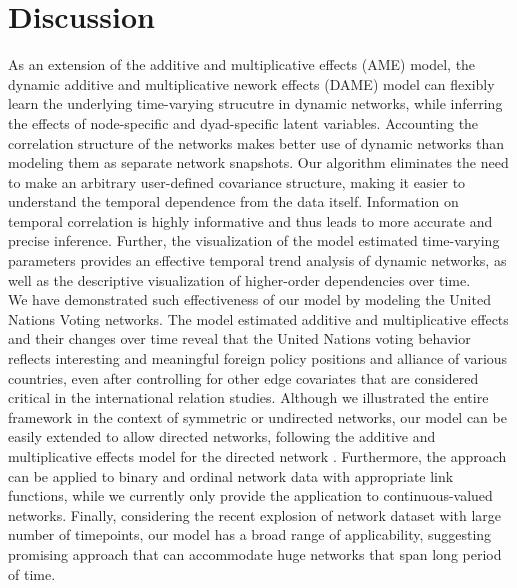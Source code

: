 \documentclass[a4paper]{article}
\begin{document}
\section{Discussion}
As an extension of the additive and multiplicative effects (AME) model, the dynamic additive and multiplicative nework effects (DAME) model can flexibly learn the underlying time-varying strucutre in dynamic networks, while inferring the effects of node-specific and dyad-specific latent variables. Accounting the correlation structure of the networks makes better use of dynamic networks than modeling them as separate network snapshots. Our algorithm eliminates the need to make an arbitrary user-defined covariance structure, making it easier to understand the temporal dependence from the data itself. Information on temporal correlation is highly informative and thus leads to more accurate and precise inference. Further, the visualization of the model estimated time-varying parameters provides an effective temporal trend analysis of dynamic networks, as well as the descriptive visualization of higher-order dependencies over time.
\\\newline
We have demonstrated such effectiveness of our model by modeling the United Nations Voting networks. The model estimated additive and multiplicative effects and their changes over time reveal that the United Nations voting behavior reflects interesting and meaningful foreign policy positions and alliance of various countries, even after controlling for other edge covariates that are considered critical in the international relation studies. Although we illustrated the entire framework in the context of symmetric or undirected networks, our model can be easily extended to allow directed networks, following the additive and multiplicative effects model for the directed network \citep{minhas2016inferential}. Furthermore, the approach can be applied to binary and ordinal network data with appropriate link functions, while we currently only provide the application to continuous-valued networks. Finally, considering the recent explosion of network dataset with large number of timepoints, our model has a broad range of applicability, suggesting promising approach that can accommodate huge networks that span long period of time.
\newpage


\newpage
\end{document}
